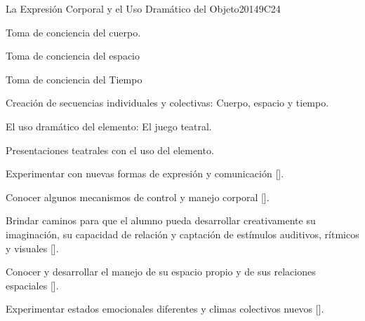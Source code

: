 \begin{syllabus}
\begin{unit}{}{La Expresión Corporal y el Uso Dramático del Objeto}{2014}{9}{C24}
\begin{topics}
	\item Toma de conciencia del cuerpo.
	\item Toma de conciencia del espacio
	\item Toma de conciencia del Tiempo
	\item Creación de secuencias individuales y colectivas: Cuerpo, espacio y tiempo.
	\item El uso dramático del elemento: El juego teatral.
	\item Presentaciones teatrales con el uso del elemento.

\end{topics}
\begin{learningoutcomes}
	\item Experimentar con nuevas formas de expresión y comunicación [\Usage].
	\item Conocer algunos mecanismos de control y manejo corporal [\Usage].
	\item Brindar caminos para que el alumno pueda desarrollar creativamente su imaginación, su capacidad de relación  y captación de estímulos auditivos, rítmicos y visuales [\Usage].
	\item Conocer y desarrollar el manejo de su espacio propio  y de sus  relaciones  espaciales  [\Usage].
	\item Experimentar  estados emocionales diferentes y climas  colectivos nuevos [\Usage].
\end{learningoutcomes}
\end{unit}


\end{syllabus}
